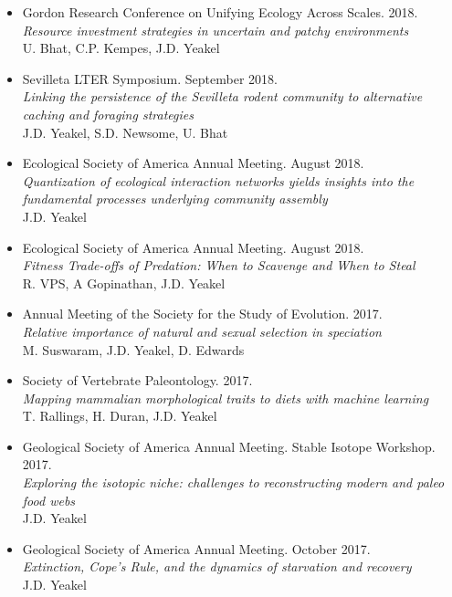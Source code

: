 \documentclass[margin,line,12pt]{res}
\begin{document}
\begin{resume}
\begin{itemize}
\item Gordon Research Conference on Unifying Ecology Across Scales. 2018.\\
\emph{Resource investment strategies in uncertain and patchy environments}\\
U. Bhat, C.P. Kempes, J.D. Yeakel

\item Sevilleta LTER Symposium. September 2018.\\
\emph{Linking the persistence of the Sevilleta rodent community to alternative caching and foraging strategies}\\
J.D. Yeakel, S.D. Newsome, U. Bhat

\item Ecological Society of America Annual Meeting. August 2018.\\
\emph{Quantization of ecological interaction networks yields insights into the fundamental processes underlying community assembly}\\
J.D. Yeakel

\item Ecological Society of America Annual Meeting. August 2018.\\
\emph{Fitness Trade-offs of Predation: When to Scavenge and When to Steal}\\
R. VPS, A Gopinathan, J.D. Yeakel

\item Annual Meeting of the Society for the Study of Evolution. 2017.\\
\emph{Relative importance of natural and sexual selection in speciation}\\
M. Suswaram, J.D. Yeakel, D. Edwards

\item Society of Vertebrate Paleontology. 2017.\\
\emph{Mapping mammalian morphological traits to diets with machine learning}\\
T. Rallings, H. Duran, J.D. Yeakel

\item Geological Society of America Annual Meeting. Stable Isotope Workshop. 2017.\\
\emph{Exploring the isotopic niche: challenges to reconstructing modern and paleo food
webs}\\
J.D. Yeakel

\item Geological Society of America Annual Meeting. October 2017.\\
\emph{Extinction, Cope's Rule, and the dynamics of starvation and recovery}\\
J.D. Yeakel


\end{itemize}
\end{resume}
\end{document}
